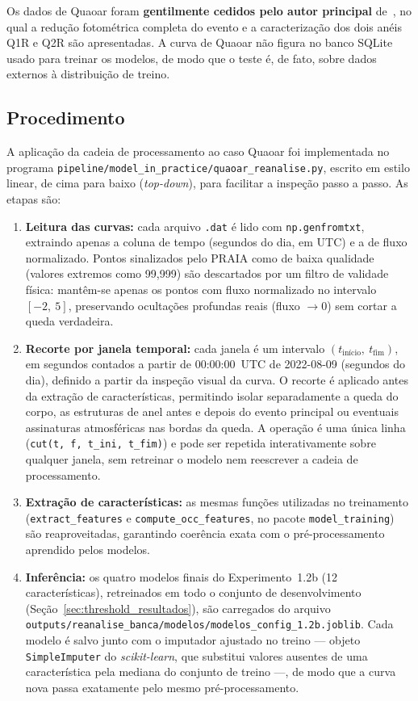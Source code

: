 Os dados de Quaoar foram \textbf{gentilmente cedidos pelo autor principal} de~\citet{Quaoar2023}, no qual a redução fotométrica completa do evento e a caracterização dos dois anéis Q1R e Q2R são apresentadas. A curva de Quaoar não figura no banco SQLite usado para treinar os modelos, de modo que o teste é, de fato, sobre dados externos à distribuição de treino.

\subsection{Procedimento}

A aplicação da cadeia de processamento ao caso Quaoar foi implementada no programa \texttt{pipeline/model\_in\_practice/quaoar\_reanalise.py}, escrito em estilo linear, de cima para baixo (\textit{top-down}), para facilitar a inspeção passo a passo. As etapas são:

\begin{enumerate}
	\item \textbf{Leitura das curvas:} cada arquivo \texttt{.dat} é lido com \texttt{np.genfromtxt}, extraindo apenas a coluna de tempo (segundos do dia, em UTC) e a de fluxo normalizado. Pontos sinalizados pelo PRAIA como de baixa qualidade (valores extremos como 99{,}999) são descartados por um filtro de validade física: mantêm-se apenas os pontos com fluxo normalizado no intervalo $[-2,\ 5]$, preservando ocultações profundas reais (fluxo $\to 0$) sem cortar a queda verdadeira.
	\item \textbf{Recorte por janela temporal:} cada janela é um intervalo $(t_{\text{início}},\ t_{\mathrm{fim}})$, em segundos contados a partir de 00:00:00~UTC de 2022-08-09 (segundos do dia), definido a partir da inspeção visual da curva. O recorte é aplicado antes da extração de características, permitindo isolar separadamente a queda do corpo, as estruturas de anel antes e depois do evento principal ou eventuais assinaturas atmosféricas nas bordas da queda. A operação é uma única linha (\texttt{cut(t, f, t\_ini, t\_fim)}) e pode ser repetida interativamente sobre qualquer janela, sem retreinar o modelo nem reescrever a cadeia de processamento.
	\item \textbf{Extração de características:} as mesmas funções utilizadas no treinamento (\texttt{extract\_features} e \texttt{compute\_occ\_features}, no pacote \texttt{model\_training}) são reaproveitadas, garantindo coerência exata com o pré-processamento aprendido pelos modelos.
	\item \textbf{Inferência:} os quatro modelos finais do Experimento~1.2b (12 características), retreinados em todo o conjunto de desenvolvimento (Seção~\ref{sec:threshold_resultados}), são carregados do arquivo \texttt{outputs/reanalise\_banca/modelos/modelos\_config\_1.2b.joblib}. Cada modelo é salvo junto com o imputador ajustado no treino --- objeto \texttt{SimpleImputer} do \textit{scikit-learn}, que substitui valores ausentes de uma característica pela mediana do conjunto de treino ---, de modo que a curva nova passa exatamente pelo mesmo pré-processamento.
\end{enumerate}

